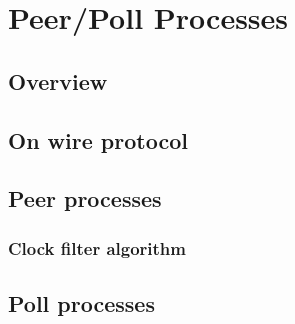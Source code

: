 \chapter{Peer/Poll Processes}
\label{cha:peer/poll}

\section{Overview}%
\label{sec:overview}

\section{On wire protocol}%
\label{sec:on_wire_protocol}

\section{Peer processes}%
\label{sec:peer_processes}

\subsection{Clock filter algorithm}%
\label{sub:clock_filter_algorithm}



\section{Poll processes}%
\label{sec:poll_processes}



